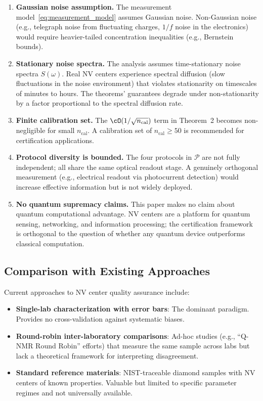 \documentclass[11pt,a4paper]{article}
\theoremstyle{definition}
\newcommand{\cP}{\mathcal{P}}
\newcommand{\NV}{NV}
\begin{document}
\begin{enumerate}[label=\textbf{L\arabic*:}, nosep]
    \item \textbf{Gaussian noise assumption.} The measurement model~\eqref{eq:measurement_model}
    assumes Gaussian noise. Non-Gaussian noise (e.g., telegraph noise from
    fluctuating charges, $1/f$ noise in the electronics) would require
    heavier-tailed concentration inequalities (e.g., Bernstein bounds).
    \item \textbf{Stationary noise spectra.} The analysis assumes time-stationary
    noise spectra $S(\omega)$. Real \NV{} centers experience spectral diffusion
    (slow fluctuations in the noise environment) that violates stationarity
    on timescales of minutes to hours. The theorems' guarantees degrade
    under non-stationarity by a factor proportional to the spectral diffusion
    rate.
    \item \textbf{Finite calibration set.} The $\cO(1/\sqrt{n_{\text{cal}}})$
    term in Theorem~2 becomes non-negligible for small $n_{\text{cal}}$.
    A calibration set of $n_{\text{cal}} \geq 50$ is recommended for
    certification applications.
    \item \textbf{Protocol diversity is bounded.} The four protocols in
    $\cP$ are not fully independent; all share the same optical readout
    stage. A genuinely orthogonal measurement (e.g., electrical readout
    via photocurrent detection) would increase effective information but
    is not widely deployed.
    \item \textbf{No quantum supremacy claims.} This paper makes no claim
    about quantum computational advantage. \NV{} centers are a platform
    for quantum sensing, networking, and information processing; the
    certification framework is orthogonal to the question of whether any
    quantum device outperforms classical computation.
\end{enumerate}

\subsection{Comparison with Existing Approaches}

Current approaches to \NV{} center quality assurance include:

\begin{itemize}[nosep]
    \item \textbf{Single-lab characterization with error bars}: The dominant
    paradigm. Provides no cross-validation against systematic biases.
    \item \textbf{Round-robin inter-laboratory comparisons}: Ad-hoc studies
    (e.g., ``Q-NMR Round Robin'' efforts) that measure the same sample
    across labs but lack a theoretical framework for interpreting disagreement.
    \item \textbf{Standard reference materials}: NIST-traceable diamond
    samples with \NV{} centers of known properties. Valuable but limited
    to specific parameter regimes and not universally available.
\end{itemize}
\end{document}
